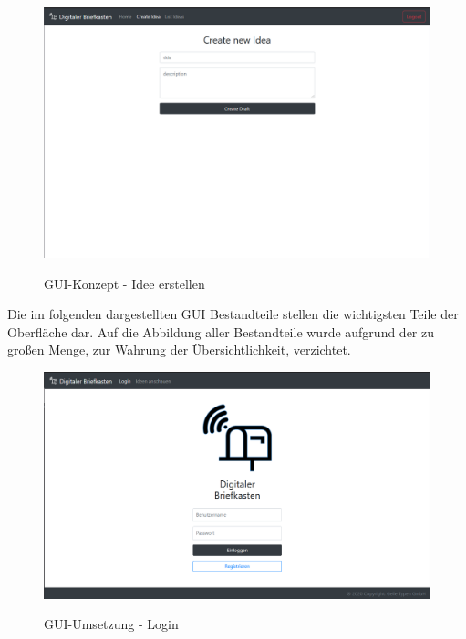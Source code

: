 \begin{figure}[h]
    \centering
    \begin{minipage}[t]{1\textwidth}
        \caption{GUI-Konzept - Idee erstellen}
        \includegraphics[width=1\textwidth]{img/createIdea-konzept.png}\\
    \end{minipage}
\end{figure}

\clearpage
\pagebreak

\label{GUI-Umsetzung}

Die im folgenden dargestellten GUI Bestandteile stellen die wichtigsten Teile der Oberfläche dar. Auf die Abbildung aller Bestandteile wurde aufgrund der zu großen Menge, zur Wahrung der Übersichtlichkeit, verzichtet.

\begin{figure}[h]
    \centering
    \begin{minipage}[t]{1\textwidth}
        \caption{GUI-Umsetzung - Login }
        \includegraphics[width=1\textwidth]{img/login-umsetzung.png}\\
    \end{minipage}
\end{figure}

